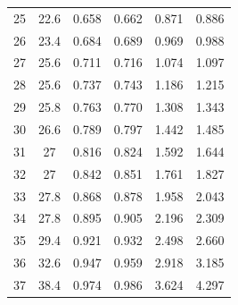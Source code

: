 \begin{table}[H]
\begin{tabular}{cccccc}
    25         & 22.6                        & 0.658                      & 0.662                       & 0.871                   & 0.886                   \\
    26         & 23.4                        & 0.684                      & 0.689                       & 0.969                   & 0.988                   \\
    27         & 25.6                        & 0.711                      & 0.716                       & 1.074                   & 1.097                   \\
    28         & 25.6                        & 0.737                      & 0.743                       & 1.186                   & 1.215                   \\
    29         & 25.8                        & 0.763                      & 0.770                       & 1.308                   & 1.343                   \\
    30         & 26.6                        & 0.789                      & 0.797                       & 1.442                   & 1.485                   \\
    31         & 27                          & 0.816                      & 0.824                       & 1.592                   & 1.644                   \\
    32         & 27                          & 0.842                      & 0.851                       & 1.761                   & 1.827                   \\
    33         & 27.8                        & 0.868                      & 0.878                       & 1.958                   & 2.043                   \\
    34         & 27.8                        & 0.895                      & 0.905                       & 2.196                   & 2.309                   \\
    35         & 29.4                        & 0.921                      & 0.932                       & 2.498                   & 2.660                   \\
    36         & 32.6                        & 0.947                      & 0.959                       & 2.918                   & 3.185                   \\
    37         & 38.4                        & 0.974                      & 0.986                       & 3.624                   & 4.297         \\
    \bottomrule         
    \end{tabular}
    \end{table}

